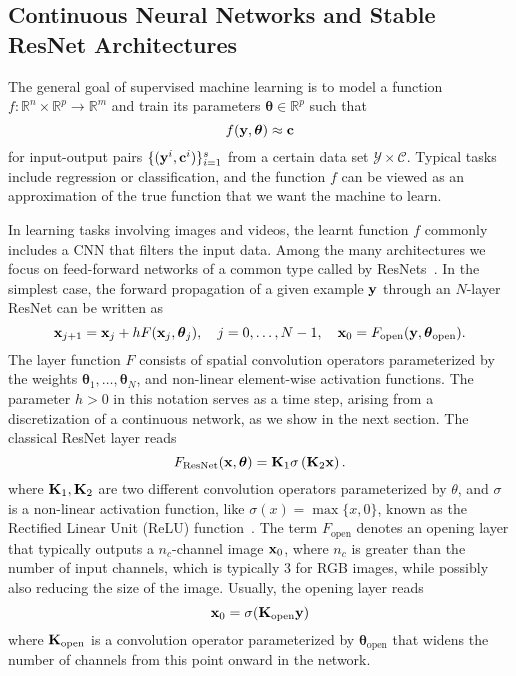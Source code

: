 \documentclass[reqno]{amsart}
\newcommand{\R}{{\mathbb{R}}}
\newcommand{\bfc}{{\bf c}}
\newcommand{\bfx}{ {\bf x}}
\newcommand{\bfy}{ {\bf y}}
\newcommand{\bfK}{{\bf K}}
\newcommand{\bftheta}{{\boldsymbol{\theta}}}
\begin{document}
\subsection{\textbf{Continuous Neural Networks and Stable ResNet Architectures}} 
\label{sub:background_continuous}
The general goal of supervised machine learning is to model a function $f : \R^n \times \R^p \to \R^m$ and train its parameters $\bftheta\in \R^p$ such that
\begin{equation}
\label{eq:interp}
    f(\bfy, \bftheta) \approx \bfc
\end{equation}
for input-output pairs $\{(\bfy^i,\bfc^i)\}_{i=1}^s$ from a certain data set $\mathcal{Y} \times \mathcal{C}$. Typical tasks include regression or classification, and the function $f$ can be viewed as an approximation of the true function that we want the machine to learn.

In learning tasks involving images and videos, the learnt function $f$ commonly includes a CNN that filters the input data.
Among the many architectures we focus on feed-forward networks of a common type called by ResNets~\cite{he2016deep}. In the simplest case, the forward propagation of a given example $\bfy$ through an $N$-layer ResNet can be written as
\begin{equation}
\label{eq:resnetintro}
    \bfx_{j+1} = \bfx_j + h F(\bfx_j, \bftheta_{j}), \quad j=0,\ldots,N-1, \quad \bfx_0 = F_{\mathrm{open}}(\bfy,\bftheta_{\mathrm{open}}).
\end{equation}
The layer function $F$ consists of spatial convolution operators parameterized by the weights $\bftheta_1, \ldots, \bftheta_N$, and non-linear element-wise activation functions. The parameter $h>0$ in this notation serves as a time step, arising from a discretization of a continuous network, as we show in the next section.
The classical ResNet layer reads 
\begin{equation}
\label{eq:resnet}
    F_{\rm ResNet}(\bfx,\bftheta) = \bfK_1 \sigma \left( \bfK_2 \bfx\right).
\end{equation}
where $\bfK_1,\bfK_2$ are two different convolution operators parameterized by $\theta$, and $\sigma$ is a non-linear activation function, like $\sigma(x) = \max\{x,0\}$, known as the Rectified Linear Unit (ReLU) function~\cite{nair2010relu}. The term $F_{\mathrm{open}}$ denotes an opening layer that typically outputs a $n_c$-channel image $\bfx_0$, where $n_c$ is greater than the number of input channels, which is typically 3 for RGB images, while possibly also reducing the size of the image. Usually, the opening layer reads  
\begin{equation}
\bfx_0 = \sigma(\bfK_{\mathrm{open}}\bfy)
\end{equation}
where $\bfK_{\mathrm{open}}$ is a convolution operator parameterized by $\bftheta_{\mathrm{open}}$ that widens the number of channels from this point onward in the network. 
\end{document}
